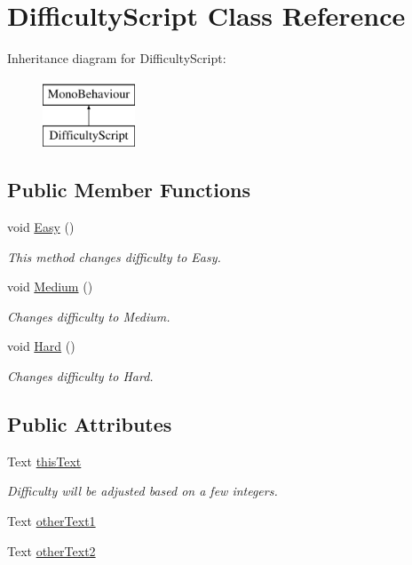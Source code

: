 \hypertarget{class_difficulty_script}{}\section{Difficulty\+Script Class Reference}
\label{class_difficulty_script}
Inheritance diagram for Difficulty\+Script\+:\begin{figure}[H]
\begin{center}
\leavevmode
\includegraphics[height=2.000000cm]{class_difficulty_script}
\end{center}
\end{figure}
\subsection*{Public Member Functions}
\begin{DoxyCompactItemize}
\item 
void \hyperlink{class_difficulty_script_ad8913d5e49546c27235a5237a8338a48}{Easy} ()
\begin{DoxyCompactList}\small\item\em This method changes difficulty to Easy. \end{DoxyCompactList}\item 
void \hyperlink{class_difficulty_script_aaa1f844ba07536daad09d0d953f15ee9}{Medium} ()
\begin{DoxyCompactList}\small\item\em Changes difficulty to Medium. \end{DoxyCompactList}\item 
void \hyperlink{class_difficulty_script_a114d050f8e4c4bc684728ea9d4f143d1}{Hard} ()
\begin{DoxyCompactList}\small\item\em Changes difficulty to Hard. \end{DoxyCompactList}\end{DoxyCompactItemize}
\subsection*{Public Attributes}
\begin{DoxyCompactItemize}
\item 
Text \hyperlink{class_difficulty_script_a6cf366e11e24688822b51ad02a591d12}{this\+Text}
\begin{DoxyCompactList}\small\item\em Difficulty will be adjusted based on a few integers. \end{DoxyCompactList}\item 
Text \hyperlink{class_difficulty_script_ac35d383f05d94d0388dae2aa9544aeec}{other\+Text1}
\item 
Text \hyperlink{class_difficulty_script_a88e0b2f1fdb864f25e32c7945467befa}{other\+Text2}
\end{DoxyCompactItemize}
